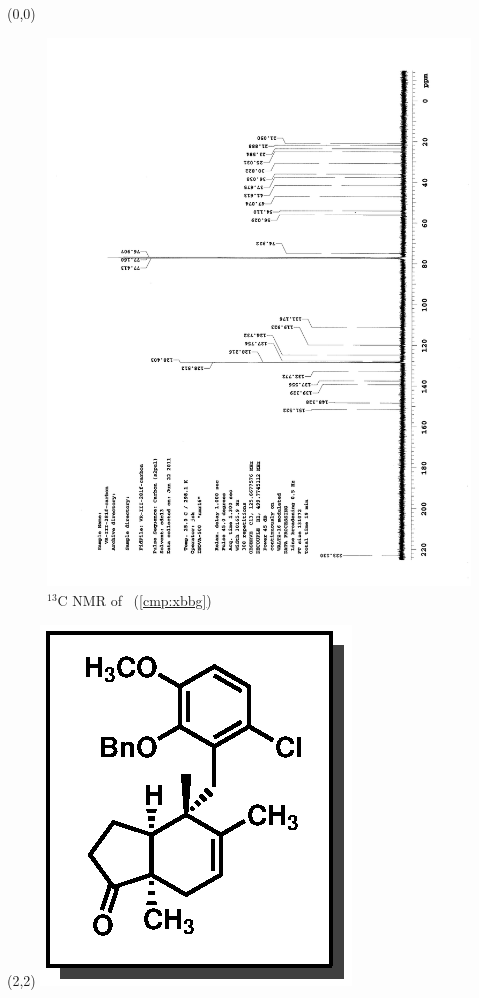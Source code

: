 \clearpage
\begin{textblock}{20}(0,0)
\begin{figure}[htb]
\caption{$^{13}$C NMR of  \CMPxbbg\ (\ref{cmp:xbbg})}
\includegraphics[scale=0.75, trim = 0mm 0mm 0mm 5mm,
clip]{chp_singlecarbon/images/nmr/xbbgC}
\vspace{-100pt}
\end{figure}
\end{textblock}
\begin{textblock}{1}(2,2)
\includegraphics[scale=0.8, angle=90]{chp_singlecarbon/images/xbbg}
\end{textblock}
\clearpage

